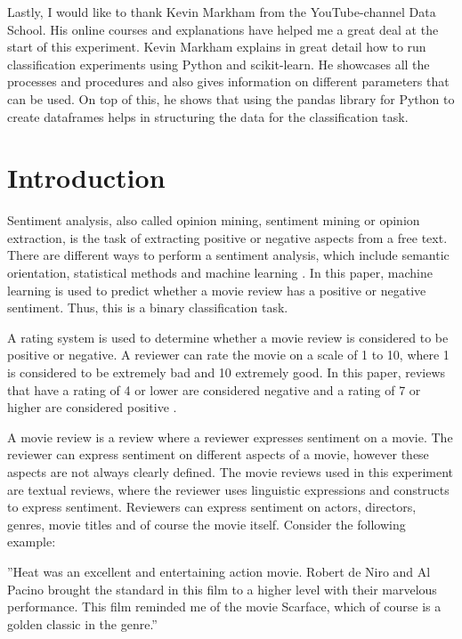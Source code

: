 \documentclass[
10pt, %
a4paper, %
oneside, %
headinclude,footinclude, %
] {book}%
\begin{document}
Lastly, I would like to thank Kevin Markham from the YouTube-channel Data School. His online courses and explanations have helped me a great deal at the start of this experiment. Kevin Markham explains in great detail how to run classification experiments using Python and scikit-learn. He showcases all the processes and procedures and also gives information on different parameters that can be used. On top of this, he shows that using the pandas library for Python to create dataframes helps in structuring the data for the classification task. 



\chapter{Introduction}

Sentiment analysis, also called opinion mining, sentiment mining or opinion extraction, is the task of extracting positive or negative aspects from a free text. There are different ways to perform a sentiment analysis, which include semantic orientation, statistical methods and machine learning \citep{liu2012sentiment}. In this paper, machine learning is used to predict whether a movie review has a positive or negative sentiment. Thus, this is a binary classification task.

A rating system is used to determine whether a movie review is considered to be positive or negative. A reviewer can rate the movie on a scale of 1 to 10, where 1 is considered to be extremely bad and 10 extremely good. In this paper, reviews that have a rating of 4 or lower are considered negative and a rating of 7 or higher are considered positive \citep{maas2011learning}.

A movie review is a review where a reviewer expresses sentiment on a movie. The reviewer can express sentiment on different aspects of a movie, however these aspects are not always clearly defined. The movie reviews used in this experiment are textual reviews, where the reviewer uses linguistic expressions and constructs to express sentiment. Reviewers can express sentiment on actors, directors, genres, movie titles and of course the movie itself. Consider the following example:

\begin{center}
''Heat was an excellent and entertaining action movie. Robert de Niro and Al Pacino brought the standard in this film to a higher level with their marvelous performance.  This film reminded me of the movie Scarface, which of course is a golden classic in the genre.''
\end{center}
\end{document}
